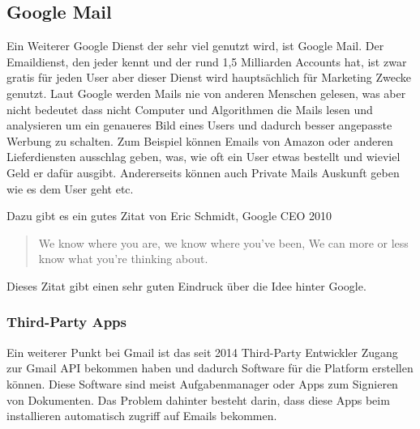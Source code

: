 \documentclass{article}
\begin{document}
\subsection{Google Mail}
Ein Weiterer Google Dienst der sehr viel genutzt wird, ist Google Mail. Der Emaildienst, den jeder kennt und der rund 1,5 Milliarden Accounts hat, ist zwar gratis für jeden User aber dieser Dienst wird hauptsächlich für Marketing Zwecke genutzt. Laut Google werden Mails nie von anderen Menschen gelesen, was aber nicht bedeutet dass nicht Computer und Algorithmen die Mails lesen und analysieren um ein genaueres Bild eines Users und dadurch besser angepasste Werbung zu schalten. Zum Beispiel können Emails von Amazon oder anderen Lieferdiensten ausschlag geben, was, wie oft ein User etwas bestellt und wieviel Geld er dafür ausgibt. Andererseits können auch Private Mails Auskunft geben wie es dem User geht etc.


    

Dazu gibt es ein gutes Zitat von Eric Schmidt, Google CEO 2010

\begin{quote}
     We know where you are, we know where you’ve been, We can more or less know what you’re thinking about.
\end{quote} 
Dieses Zitat gibt einen sehr guten Eindruck über die Idee hinter Google.\newline


\subsubsection{Third-Party Apps}
Ein weiterer Punkt bei Gmail ist das seit 2014 Third-Party Entwickler Zugang zur Gmail API bekommen haben und dadurch Software für die Platform erstellen können. Diese Software sind meist Aufgabenmanager oder Apps zum Signieren von Dokumenten. Das Problem dahinter besteht darin, dass diese Apps beim installieren automatisch zugriff auf Emails bekommen.
\end{document}
